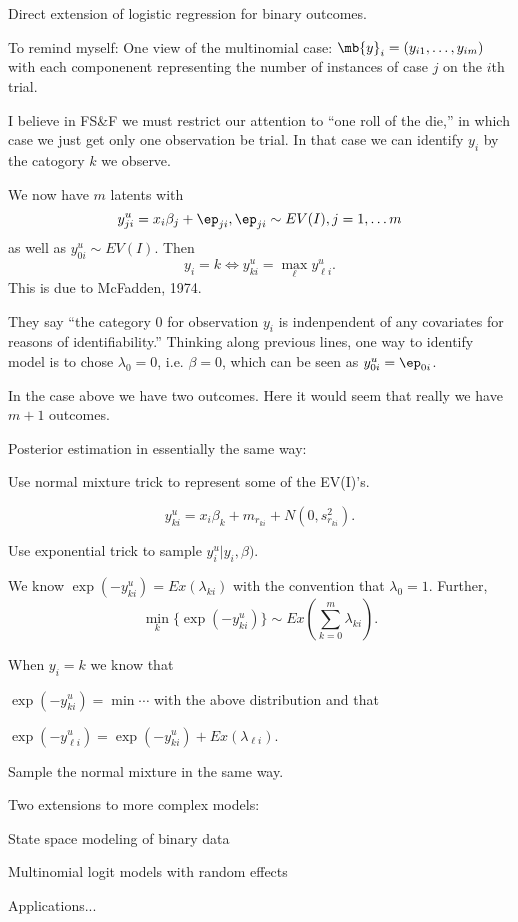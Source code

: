 \documentclass{article}
\begin{document}
\begin{outline}
  \2 Direct extension of logistic regression for binary outcomes.

  To remind myself: One view of the multinomial case: $\mb{y}_i = (y_{i1},
  \ldots, y_{im})$ with each componenent representing the number of instances of
  case $j$ on the $i$th trial.

  I believe in FS\&F we must restrict our attention to ``one roll of the
  die,'' in which case we just get only one observation be trial.  In that case
  we can identify $y_i$ by the catogory $k$ we observe.

  We now have $m$ latents with
  \[
  y_{ji}^u = x_i \beta_j + \ep_{ji}, \ep_{ji} \sim EV(I), j = 1, \ldots m
  \]
  as well as $y_{0i}^u \sim EV(I)$.  Then
  \[
  y_i = k \iff y_{ki}^u = \max_{\ell} y_{\ell i}^u.
  \]
  This is due to McFadden, 1974.

  They say ``the category 0 for observation $y_i$ is indenpendent of any
  covariates for reasons of identifiability.''  Thinking along previous lines,
  one way to identify model is to chose $\lambda_0 = 0$, i.e. $\beta = 0$, which
  can be seen as $y_{0i}^u = \ep_{0i}$.

  In the case above we have two outcomes. Here it would seem that really we have
  $m+1$ outcomes.

  \2 Posterior estimation in essentially the same way:

    \3 Use normal mixture trick to represent some of the EV(I)'s.

    \[
    y_{ki}^u = x_i \beta_k + m_{r_{ki}} + N(0, s_{r_{ki}}^2).
    \]

    \3 Use exponential trick to sample $y_i^u | y_i, \beta)$.

    We know $\exp(-y_{ki}^u) = Ex(\lambda_{ki})$ with the convention that
    $\lambda_0 = 1$.  Further,
    \[
    \min_k \Big\{ \exp(-y_{ki}^u) \Big\} \sim Ex( \sum_{k=0}^m \lambda_{ki} ).
    \]
    
    When $y_i = k$ we know that 

    \4 $\exp(-y_{ki}^u) = \min \cdots$ with the above distribution and that
    
    \4 $\exp(-y_{\ell i}^u) = \exp(-y_{ki}^u) + Ex(\lambda_{\ell i})$.

    \3 Sample the normal mixture in the same way.

\1 Two extensions to more complex models:

  \2 State space modeling of binary data

  \2 Multinomial logit models with random effects

\1 Applications...

\end{outline}
\end{document}
